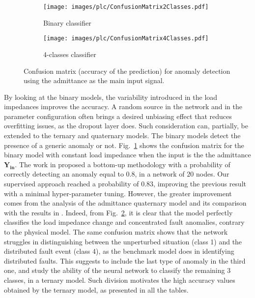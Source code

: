 \begin{figure}
\centering
\begin{subfigure}{0.5\textwidth}
  \centering
 \texttt{[image: images/plc/ConfusionMatrix2Classes.pdf]}
	\caption{Binary classifier}
	\label{fig:plc_Confusion2}
\end{subfigure}%
\begin{subfigure}{0.5\textwidth}
 \centering
	\texttt{[image: images/plc/ConfusionMatrix4Classes.pdf]}
	\caption{4-classes classifier}
	\label{fig:plc_Confusion4}
 \end{subfigure}%
 \caption{Confusion matrix (accuracy of the prediction) for anomaly detection using the admittance as the main input
signal.}
\label{fig:plc_Confusion}
\end{figure}


By looking at the binary models, the variability introduced in the load impedances improves the accuracy. A random source in the network and in the parameter configuration often brings a desired unbiasing effect that reduces overfitting issues, as the dropout layer does. Such consideration can, partially, be extended to the ternary and quaternary models.
The binary models detect the presence of a generic anomaly or not. Fig.~\ref{fig:plc_Confusion2} shows the confusion matrix for the binary model with constant load impedance when the input is the the admittance $\mathbf{Y_{\text{in}}}$. The work in \cite{8641473} proposed a bottom-up methodology with a probability of correctly detecting an anomaly equal to $0.8$, in a network of $20$ nodes. Our supervised approach reached a probability of $0.83$, improving the previous result with a minimal hyper-parameter tuning. However, the greater improvement comes from the analysis of the admittance quaternary model and its comparison with the results in \cite{8641473}. Indeed, from Fig.~\ref{fig:plc_Confusion4}, it is clear that the model perfectly classifies the load impedance change and concentrated fault anomalies, contrary to the physical model. The same confusion matrix shows that the network struggles in distinguishing between the unperturbed situation (class 1) and the distributed
fault event (class 4), as the benchmark model does in identifying distributed faults. This suggests to include the last type of anomaly in the third one, and study the ability of the neural network to classify the remaining 3 classes, in a ternary model. Such division motivates the high accuracy values obtained by the ternary model, as presented in all the tables. 

